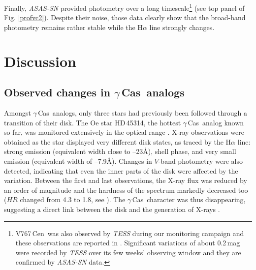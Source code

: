 \documentclass[a4paper,fleqn,usenatbib]{mnras}
\newcommand{\gc}{$\gamma$\,Cas}
\newcommand{\vc}{V767\,Cen}
\begin{document}
Finally, {\it ASAS-SN} provided photometry over a long timescale\footnote{\vc\ was also observed by {\it TESS} during our monitoring campaign and these observations are reported in \citet{naz20tess}. Significant variations of about 0.2\,mag were recorded by {\it TESS} over its few weeks' observing window and they are confirmed by {\it ASAS-SN} data.} (see top panel of Fig. \ref{profvc2}). Despite their noise, those data clearly show that the broad-band photometry remains rather stable while the H$\alpha$ line strongly changes.

\section{Discussion}
\subsection{Observed changes in \gc\ analogs}
Amongst \gc\ analogs, only three stars had previously been followed through a transition of their disk. The Oe star HD\,45314, the hottest \gc\ analog known so far, was monitored extensively in the optical range \citep{rau18}. X-ray observations were obtained as the star displayed very different disk states, as traced by the H$\alpha$ line: strong emission (equivalent width close to --23\AA), shell phase, and very small emission (equivalent width of --7.9\AA). Changes in $V$-band photometry were also detected, indicating that even the inner parts of the disk were affected by the variation. Between the first and last observations, the X-ray flux was reduced by an order of magnitude and the hardness of the spectrum markedly decreased too ($HR$ changed from 4.3 to 1.8, see \citealt{naz18}). The \gc\ character was thus disappearing, suggesting a direct link between the disk and the generation of X-rays \citep{rau18}. 
\end{document}
